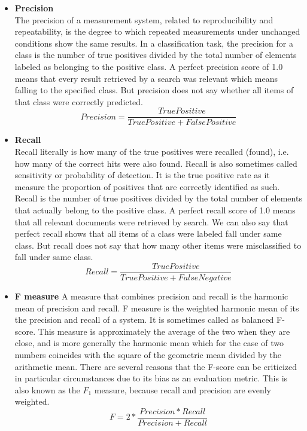 \begin{itemize}
        \item \textbf{Precision}\\
                The precision of a measurement system, related to reproducibility and repeatability, is the degree to which repeated measurements under unchanged
                conditions show the same results. In a classification task, the precision for a class is the number of true positives divided by the total number of elements labeled as 
                belonging to the positive class. A perfect precision score of 1.0 means that every result retrieved by a search was relevant which means falling to the specified class.
                But precision does not say whether all items of that class were correctly predicted.
                \begin{equation}
                        Precision = \frac{True Positive}{True Positive + False Positive}
                \end{equation}
        \item \textbf{Recall}\\
                Recall literally is how many of the true positives were recalled (found), i.e. how many of the correct hits were also found. Recall is also sometimes called sensitivity or probability of detection.
                It is the true positive rate as it measure the proportion of positives that are correctly identified as such. Recall is the number of true positives divided by the total number of elements
                that actually belong to the positive class. A perfect recall score of 1.0 means that all relevant documents were retrieved by search. We can also say that perfect recall shows that all items of a
                class were labeled fall under same class. But recall does not say that how many other items were misclassified to fall under same class.
                \begin{equation}
                        Recall = \frac{True Positive}{True Positive + False Negative}
                \end{equation}
        \item \textbf{F measure}
               A measure that combines precision and recall is the harmonic mean of precision and recall. 
                F measure is the weighted harmonic mean of its the precision and recall of a system. It is sometimes called as balanced F-score. This measure is approximately the average of the two when they are close, and is more generally
                the harmonic mean which for the case of two numbers coincides with the square of the geometric mean divided by the arithmetic mean. There are several reasons that the F-score can be criticized in particular 
                circumstances due to its bias as an evaluation metric. This is also known as the $F_1$ measure, because recall and precision are evenly weighted.
                \begin{equation}
                        F = 2*\frac{Precision*Recall}{Precision+Recall}
                \end{equation}
        \end{itemize}
